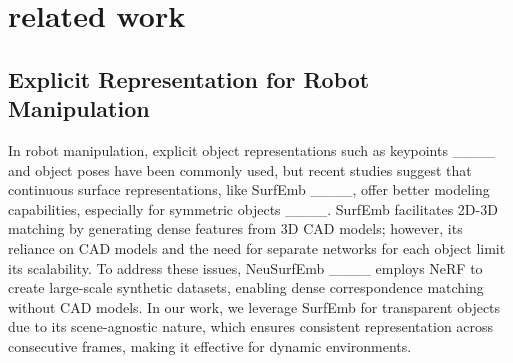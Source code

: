 \section{related work}
\label{sec:relatedwork}

\subsection{Explicit Representation for Robot Manipulation}


In robot manipulation, explicit object representations such as keypoints ____ and object poses have been commonly used, but recent studies suggest that continuous surface representations, like SurfEmb ____, offer better modeling capabilities, especially for symmetric objects ____. SurfEmb facilitates 2D-3D matching by generating dense features from 3D CAD models; however, its reliance on CAD models and the need for separate networks for each object limit its scalability. To address these issues, NeuSurfEmb ____ employs \ac{NeRF} to create large-scale synthetic datasets, enabling dense correspondence matching without CAD models. In our work, we leverage SurfEmb for transparent objects due to its scene-agnostic nature, which ensures consistent representation across consecutive frames, making it effective for dynamic environments.

